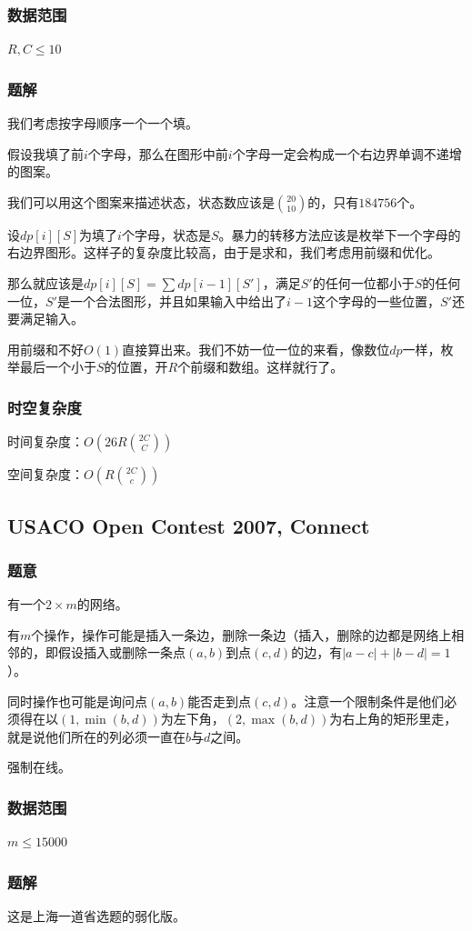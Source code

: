 \documentclass{ctexart}
\begin{document}
\subsubsection{数据范围}
$R,C \le 10$
\subsubsection{题解}
我们考虑按字母顺序一个一个填。

假设我填了前$i$个字母，那么在图形中前$i$个字母一定会构成一个右边界单调不递增的图案。

我们可以用这个图案来描述状态，状态数应该是${20 \choose 10}$的，只有$184756$个。

设$dp[i][S]$为填了$i$个字母，状态是$S$。暴力的转移方法应该是枚举下一个字母的右边界图形。这样子的复杂度比较高，由于是求和，我们考虑用前缀和优化。

那么就应该是$dp[i][S]=\sum dp[i-1][S']$，满足$S'$的任何一位都小于$S$的任何一位，$S'$是一个合法图形，并且如果输入中给出了$i-1$这个字母的一些位置，$S'$还要满足输入。

用前缀和不好$O(1)$直接算出来。我们不妨一位一位的来看，像数位$dp$一样，枚举最后一个小于$S$的位置，开$R$个前缀和数组。这样就行了。
\subsubsection{时空复杂度}
时间复杂度：$O(26R{2C \choose C})$

空间复杂度：$O(R{2C \choose c})$
\subsection{USACO Open Contest 2007, Connect}
\subsubsection{题意}
有一个$2 \times m$的网络。

有$m$个操作，操作可能是插入一条边，删除一条边（插入，删除的边都是网络上相邻的，即假设插入或删除一条点$(a,b)$到点$(c,d)$的边，有$|a-c|+|b-d|=1$）。

同时操作也可能是询问点$(a,b)$能否走到点$(c,d)$。注意一个限制条件是他们必须得在以$(1,\min(b,d))$为左下角，$(2,\max(b,d))$为右上角的矩形里走，就是说他们所在的列必须一直在$b$与$d$之间。

强制在线。
\subsubsection{数据范围}
$m \le 15000$
\subsubsection{题解}
这是上海一道省选题的弱化版。
\end{document}
